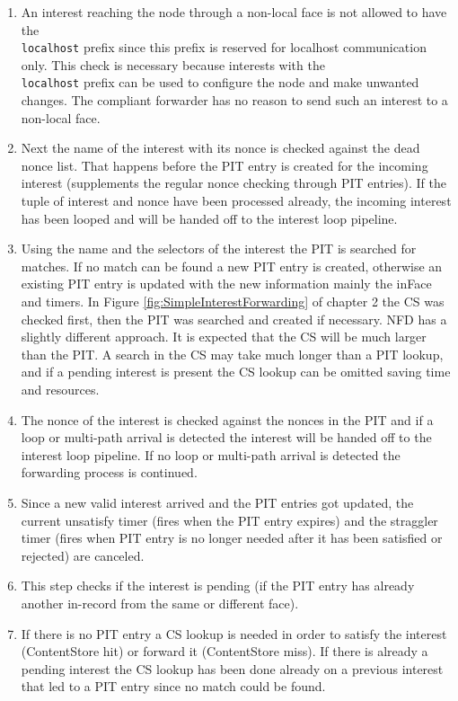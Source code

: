 \begin{enumerate}
\item An interest reaching the node through a non-local face is not allowed to have the \texttt{\\localhost} prefix since this prefix is reserved for localhost communication only. This check is necessary because interests with the \texttt{\\localhost} prefix can be used to configure the node and make unwanted changes. The compliant forwarder has no reason to send such an interest to a non-local face.
\item Next the name of the interest with its nonce is checked against the dead nonce list. That happens before the PIT entry is created for the incoming interest (supplements the regular nonce checking through PIT entries). If the tuple of interest and nonce have been processed already, the incoming interest has been looped and will be handed off to the interest loop pipeline.
\item Using the name and the selectors of the interest the PIT is searched for matches. If no match can be found a new PIT entry is created, otherwise an existing PIT entry is updated with the new information mainly the inFace and timers. In Figure \ref{fig:SimpleInterestForwarding} of chapter 2 the CS was checked first, then the PIT was searched and created if necessary. NFD has a slightly different approach. It is expected that the CS will be much larger than the PIT. A search in the CS may take much longer than a PIT lookup, and if a pending interest is present the CS lookup can be omitted saving time and resources.
\item The nonce of the interest is checked against the nonces in the PIT and if a loop or multi-path arrival is detected the interest will be handed off to the interest loop pipeline. If no loop or multi-path arrival is detected the forwarding process is continued.
\item Since a new valid interest arrived and the PIT entries got updated, the current unsatisfy timer (fires when the PIT entry expires) and the straggler timer (fires when PIT entry is no longer needed after it has been satisfied or rejected) are canceled.
\item This step checks if the interest is pending (if the PIT entry has already another in-record from the same or different face).
\item If there is no PIT entry a CS lookup is needed in order to satisfy the interest (ContentStore hit) or forward it (ContentStore miss). If there is already a pending interest the CS lookup has been done already on a previous interest that led to a PIT entry since no match could be found.
\end{enumerate}

